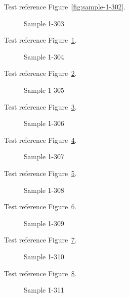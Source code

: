 Test reference Figure~\ref{fig:sample-1-302}.

\begin{figure}[tbhp]
\caption{Sample 1-303}
\label{fig:sample-1-303}
\end{figure}

Test reference Figure~\ref{fig:sample-1-303}.

\begin{figure}[tbhp]
\caption{Sample 1-304}
\label{fig:sample-1-304}
\end{figure}

Test reference Figure~\ref{fig:sample-1-304}.

\begin{figure}[tbhp]
\caption{Sample 1-305}
\label{fig:sample-1-305}
\end{figure}

Test reference Figure~\ref{fig:sample-1-305}.

\begin{figure}[tbhp]
\caption{Sample 1-306}
\label{fig:sample-1-306}
\end{figure}

Test reference Figure~\ref{fig:sample-1-306}.

\begin{figure}[tbhp]
\caption{Sample 1-307}
\label{fig:sample-1-307}
\end{figure}

Test reference Figure~\ref{fig:sample-1-307}.

\begin{figure}[tbhp]
\caption{Sample 1-308}
\label{fig:sample-1-308}
\end{figure}

Test reference Figure~\ref{fig:sample-1-308}.

\begin{figure}[tbhp]
\caption{Sample 1-309}
\label{fig:sample-1-309}
\end{figure}

Test reference Figure~\ref{fig:sample-1-309}.

\begin{figure}[tbhp]
\caption{Sample 1-310}
\label{fig:sample-1-310}
\end{figure}

Test reference Figure~\ref{fig:sample-1-310}.

\begin{figure}[tbhp]
\caption{Sample 1-311}
\label{fig:sample-1-311}
\end{figure}

